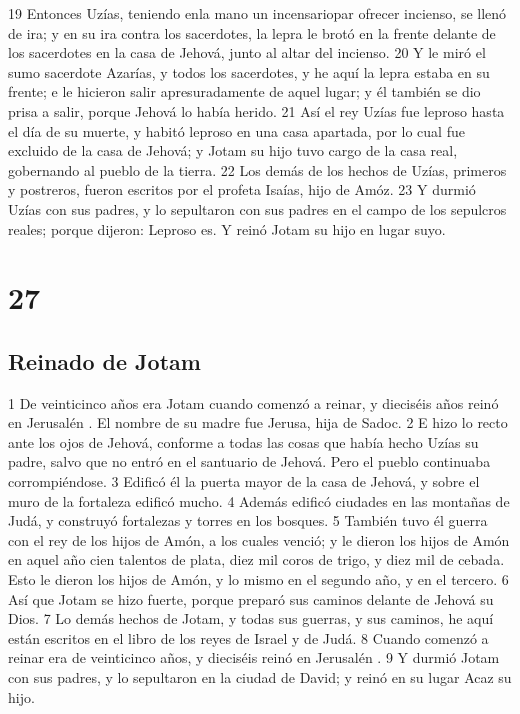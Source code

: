 19 Entonces Uzías, teniendo enla mano un incensariopar ofrecer incienso, se llenó de ira; y en su ira contra los sacerdotes, la lepra le brotó en la frente delante de los sacerdotes en la casa de Jehová, junto al altar del incienso.
20 Y le miró el sumo sacerdote Azarías, y todos los sacerdotes, y he aquí la lepra estaba en su frente; e le hicieron salir apresuradamente de aquel lugar; y él también se dio prisa a salir, porque Jehová lo había herido.
21 Así el rey Uzías fue leproso hasta el día de su muerte, y habitó leproso en una casa apartada, por lo cual fue excluido de la casa de Jehová; y Jotam su hijo tuvo cargo de la casa real, gobernando al pueblo de la tierra.
22 Los demás de los hechos de Uzías, primeros y postreros, fueron escritos por el profeta Isaías, hijo de Amóz.
23 Y durmió Uzías con sus padres, y lo sepultaron con sus padres en el campo de los sepulcros reales; porque dijeron: Leproso es. Y reinó Jotam su hijo en lugar suyo.

\chapter{27}

\section*{Reinado de Jotam}

 

1 De veinticinco años era Jotam cuando comenzó a reinar, y dieciséis años reinó en Jerusalén . El nombre de su madre fue Jerusa, hija de Sadoc.
2 E hizo lo recto ante los ojos de Jehová, conforme a todas las cosas que había hecho Uzías su padre, salvo que no entró en el santuario de Jehová. Pero el pueblo continuaba corrompiéndose.
3 Edificó él la puerta mayor de la casa de Jehová, y sobre el muro de la fortaleza edificó mucho.
4 Además edificó ciudades en las montañas de Judá, y construyó fortalezas y torres en los bosques.
5 También tuvo él guerra con el rey de los hijos de Amón, a los cuales venció; y le dieron los hijos de Amón en aquel año cien talentos de plata,  diez mil coros de trigo, y diez mil de cebada. Esto le dieron los hijos de Amón, y lo mismo en el segundo año, y en el tercero.
6 Así que Jotam se hizo fuerte, porque preparó sus caminos delante de Jehová su Dios.
7 Lo demás hechos de Jotam, y todas sus guerras, y sus caminos, he aquí están escritos en el libro de los reyes de Israel y de Judá.
8 Cuando comenzó a reinar era de veinticinco años, y dieciséis reinó en Jerusalén .
9 Y durmió Jotam con sus padres, y lo sepultaron en la ciudad de David; y reinó en su lugar Acaz su hijo.

